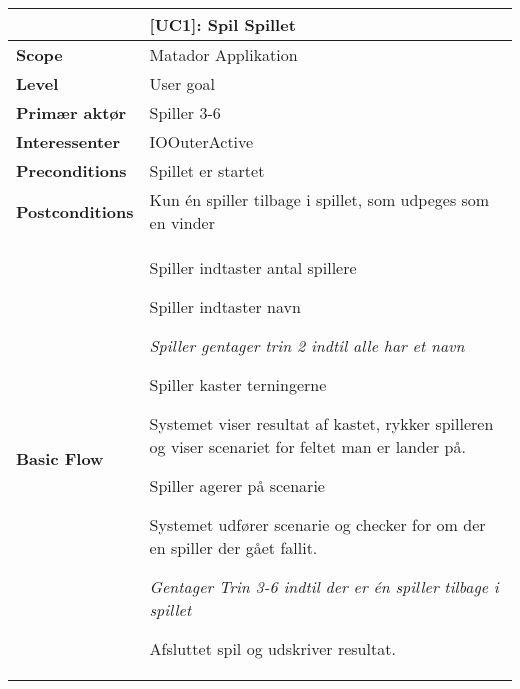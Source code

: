 \documentclass[class=article, crop=false]{standalone}
\makeatletter
\let\savespace\@minipagetrue
\makeatother
\begin{document}
    \begin{table}[H]
        \begin{tabularx}{\textwidth}{|l|X|}
            \hline
                                         & \textbf{[UC1]: Spil Spillet}   \\ \hline
            \textbf{Scope}               & Matador Applikation\\ \hline
            \textbf{Level}               & User goal     \\ \hline
            \textbf{Primær aktør}        & Spiller 3-6   \\ \hline
            \textbf{Interessenter}       & IOOuterActive\\ \hline
            \textbf{Preconditions}       & Spillet er startet \\ \hline
            \textbf{Postconditions}      & Kun én spiller tilbage i spillet,
                                           som udpeges som en vinder\\ \hline





            \textbf{Basic Flow} & \begin{tabenum}
                                  \item Spiller indtaster antal spillere
                                  \item Spiller indtaster navn
                                      \savespace
                                        \begin{compactitem}
                                            \item \textit{Spiller gentager trin 2                                                             indtil alle har et navn}
                                  \end{compactitem}
                                      \item Spiller kaster terningerne
                                      \item Systemet viser resultat af kastet, rykker spilleren og viser scenariet for feltet man er lander på.
                                      \item Spiller agerer på scenarie
                                      \item Systemet udfører scenarie og checker for om der en spiller der gået fallit.
                                  \savespace
                                  \begin{compactitem}
                                      \item \textit{Gentager Trin 3-6 indtil der er én spiller tilbage i spillet}
                                  \end{compactitem}
                                      \item Afsluttet spil og udskriver resultat.
                                   \end{tabenum}   \\ \hline





\end{tabularx}
\end{table}
\end{document}
